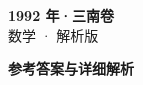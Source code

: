 \documentclass[zihao=-4, a4paper]{ctexart}
\begin{document}
\begin{center}
  {\Large\bfseries 1992 年·三南卷}\\[4pt]
  {\large 数学 · 解析版}
\end{center}
\medskip
{}

\clearpage
{}
\begin{center}{\Large\bfseries 参考答案与详细解析}\end{center}
\medskip

\end{document}
